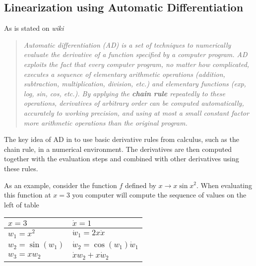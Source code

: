 \documentclass[a4paper,10pt]{article}  %
\begin{document}
\subsection{Linearization using Automatic Differentiation} %
\label{sub:linearization_using_automatic_differentiation}

As is stated on \emph{wiki}

\begin{quote}
   \em
   Automatic differentiation (AD) is a set of techniques to numerically evaluate the derivative of a function specified by a computer program. AD exploits the fact that every computer program, no matter how complicated, executes a sequence of elementary arithmetic operations (addition, subtraction, multiplication, division, etc.) and elementary functions (exp, log, sin, cos, etc.). By applying the \textbf{chain rule} repeatedly to these operations, derivatives of arbitrary order can be computed automatically, accurately to working precision, and using at most a small constant factor more arithmetic operations than the original program.
\end{quote}

The key idea of AD in to use basic derivative rules from calculus, such as the chain rule, in a numerical environment.
The derivatives are then computed together with the evaluation steps and combined with other derivatives using these rules.

As an example, consider the function $f$ defined by $x \rightarrow x \sin x^2$. When evaluating this function at
$x=3$ you computer will compute the sequence of values on the left of table

\begin{table}[H]
   \centering
   \begin{tabu} to 0.8\textwidth { | X[c] | X[c] | } \hline
      $x = 3$           &  $\dot{x} = 1$                       \\ \hline
      $w_1 = x^2$       &  $\dot{w}_1 = 2 x \dot{x}$           \\ \hline
      $w_2 = \sin(w_1)$ &  $\dot{w}_2 = \cos (w_1) \dot{w}_1$  \\ \hline
      $w_3 = x w_2$     &  $\dot{x}w_2 + x \dot{w}_2$          \\ \hline
   \end{tabu}
\end{table}
\end{document}
